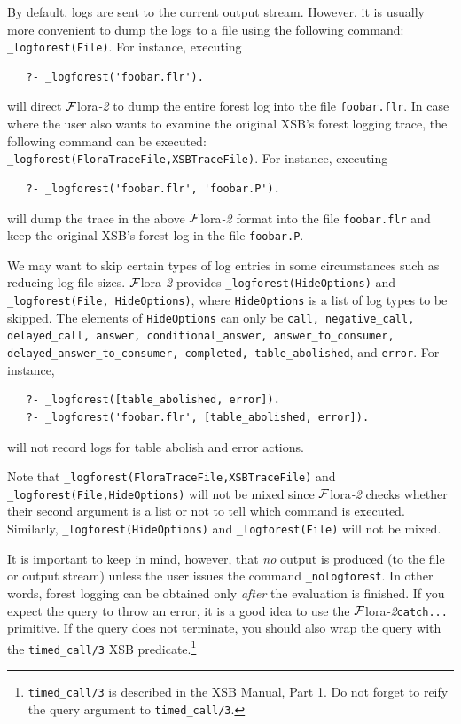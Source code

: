 \documentclass[11pt]{article}
\newcommand{\FLORA}{{\mbox{\sc ${\cal F}${lora}\rm\emph{-2}}}\xspace}
\begin{document}
By default, logs are sent to the current output stream. However, it is
usually more convenient
to dump the logs to a file using the following command:
{\tt \_logforest(File)}. For instance, executing
\begin{verbatim}
   ?- _logforest('foobar.flr').
\end{verbatim}
will direct \FLORA to dump the entire forest log into the file {\tt foobar.flr}.
In case where the user also wants to examine the original XSB's forest
logging trace, the following command can be executed: 
{\tt \_logforest(FloraTraceFile,XSBTraceFile)}. For instance, executing
\begin{verbatim}
   ?- _logforest('foobar.flr', 'foobar.P').
\end{verbatim}
will dump the trace in the above \FLORA format into the file {\tt foobar.flr}
and keep the original XSB's forest log in the file {\tt foobar.P}. 

We may want to skip certain types of log entries in some circumstances such
as reducing log file sizes. \FLORA provides {\tt \_logforest(HideOptions)} and 
{\tt \_logforest(File, HideOptions)}, where {\tt HideOptions} is a list of log
types to be skipped.
The elements of {\tt HideOptions} can only be {\tt call,
  negative\_call, delayed\_call,  answer, conditional\_answer,
  answer\_to\_consumer, delayed\_answer\_to\_consumer, completed,
  table\_abolished}, and {\tt error}. For instance,  
\begin{verbatim}
   ?- _logforest([table_abolished, error]).
   ?- _logforest('foobar.flr', [table_abolished, error]).
\end{verbatim}
will not record logs for table abolish and error actions. 

Note that {\tt \_logforest(FloraTraceFile,XSBTraceFile)} and 
{\tt \_logforest(File,HideOptions)} will not be mixed since \FLORA
checks whether their second argument is a list or not to tell
which command is executed. 
Similarly, {\tt \_logforest(HideOptions)} and {\tt \_logforest(File)}
will not be mixed.

It is important to keep in mind, however, that \emph{no} output
is produced (to the file or output stream) unless the user issues the command
{\tt \_nologforest}. In other words, forest logging can be obtained only
\emph{after} the evaluation is finished. 
If you expect the query to throw an error, it is a good idea to use the
\FLORA \texttt{catch{...}} primitive. If the query does not terminate,
you should also wrap the query with the \texttt{timed\_call/3} XSB predicate.\footnote{
  \texttt{timed\_call/3} is described in the XSB Manual, Part 1. Do not
  forget to reify the query argument to  \texttt{timed\_call/3}.
  }
\end{document}
